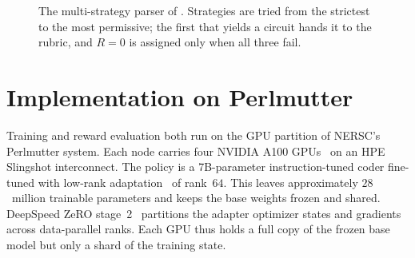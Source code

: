 \begin{figure}[htbp]
\centering
{}
\caption{The multi-strategy parser of \rubriq{}. Strategies are tried from the strictest to the most permissive; the first that yields a circuit hands it to the rubric, and $R=0$ is assigned only when all three fail.}\label{fig:syn:parser}
\end{figure}

\section{Implementation on Perlmutter}\label{sec:syn:impl}

Training and reward evaluation both run on the GPU partition of NERSC's Perlmutter system. Each node carries four NVIDIA A100 GPUs~\cite{choquette2021a100} on an HPE Slingshot interconnect. The policy is a 7B-parameter instruction-tuned coder fine-tuned with low-rank adaptation~\cite{hu2022lora} of rank~$64$. This leaves approximately $28$~million trainable parameters and keeps the base weights frozen and shared. DeepSpeed ZeRO stage~2~\cite{rajbhandari2020zero} partitions the adapter optimizer states and gradients across data-parallel ranks. Each GPU thus holds a full copy of the frozen base model but only a shard of the training state.

